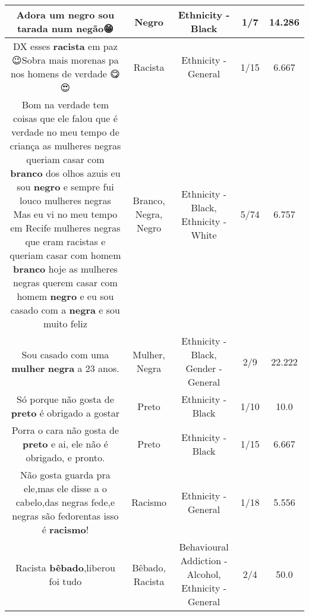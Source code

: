 \documentclass[11pt]{article}
\newlength\mylength
\begin{document}
\begin{center}
\begin{longtable}{|C{.65\mylength}|C{.30\mylength}|C{.12\mylength}|C{.12\mylength}|C{.12\mylength}|}
  \small Adora um \textbf{negro} sou tarada num negão😁\normalsize   & Negro & Ethnicity - Black & 1/7 & 14.286 \\  \hline
  \small DX esses \textbf{racista} em paz 😉Sobra mais morenas pa nos homens de verdade 😋😍\normalsize   & Racista & Ethnicity - General & 1/15 & 6.667 \\  \hline
  \small Bom na verdade tem coisas que ele falou que é verdade no meu tempo de criança as mulheres negras queriam casar com \textbf{branco} dos olhos azuis eu sou \textbf{negro} e sempre fui louco mulheres negras Mas eu vi no meu tempo em Recife mulheres negras que eram racistas e queriam casar com homem \textbf{branco} hoje as mulheres negras querem casar com homem \textbf{negro} e eu sou casado com a \textbf{negra} e sou muito feliz\normalsize   & Branco, Negra, Negro & Ethnicity - Black, Ethnicity - White & 5/74 & 6.757 \\  \hline
  \small Sou casado com uma \textbf{mulher} \textbf{negra} a 23 anos.\normalsize   & Mulher, Negra & Ethnicity - Black, Gender - General & 2/9 & 22.222 \\  \hline
  \small Só porque não gosta de \textbf{preto} é obrigado a gostar\normalsize   & Preto & Ethnicity - Black & 1/10 & 10.0 \\  \hline
  \small Porra o cara não gosta de \textbf{preto} e ai, ele não é obrigado, e pronto.\normalsize   & Preto & Ethnicity - Black & 1/15 & 6.667 \\  \hline
  \small Não gosta guarda pra ele,mas ele disse a o cabelo,das negras fede,e negras são fedorentas isso é \textbf{racismo}!\normalsize   & Racismo & Ethnicity - General & 1/18 & 5.556 \\  \hline
  \small Racista \textbf{bêbado},liberou foi tudo\normalsize   & Bêbado, Racista & Behavioural Addiction - Alcohol, Ethnicity - General & 2/4 & 50.0 \\  \hline

\end{longtable}
\end{center}
\end{document}
